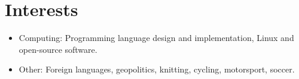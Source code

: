 \documentclass[letterpaper,11pt]{article}
\newcommand{\resumeItem}[1]{
	\item\small{
		{#1 \vspace{-2pt}}
	}
}
\newcommand{\resumeItemListStart}{\begin{itemize}}
\newcommand{\resumeItemListEnd}{\end{itemize}\vspace{-5pt}}
\begin{document}
\section{Interests}
\resumeItemListStart
\resumeItem{Computing: Programming language design and implementation, Linux and open-source software.}
\resumeItem{Other: Foreign languages, geopolitics, knitting, cycling, motorsport, soccer.}
\resumeItemListEnd

\end{document}
